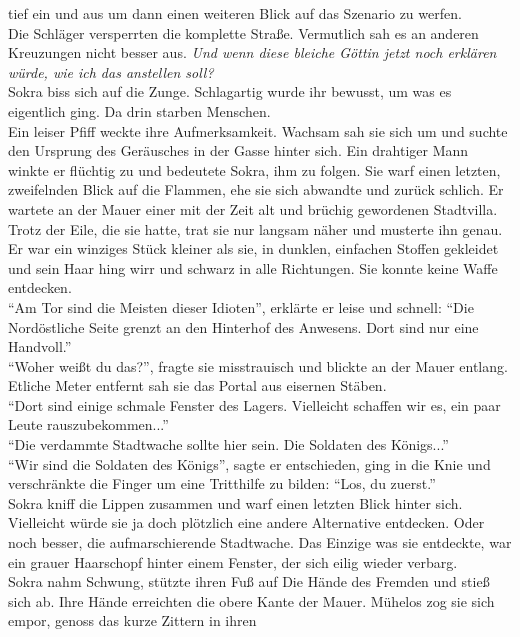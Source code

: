 tief ein und aus um dann einen weiteren Blick auf das Szenario zu werfen.\\
Die Schläger versperrten die komplette Straße. Vermutlich sah es an anderen Kreuzungen nicht besser 
aus. \textit{Und wenn diese bleiche Göttin jetzt noch erklären würde, wie ich das anstellen soll?}\\
Sokra biss sich auf die Zunge. Schlagartig wurde ihr bewusst, um was es eigentlich ging. Da drin 
starben Menschen.\\
Ein leiser Pfiff weckte ihre Aufmerksamkeit. Wachsam sah sie sich um und suchte den Ursprung des 
Geräusches in der Gasse hinter sich. Ein drahtiger Mann winkte er flüchtig zu und bedeutete Sokra, 
ihm zu folgen. Sie warf einen letzten, zweifelnden Blick auf die Flammen, ehe sie sich abwandte und 
zurück schlich. Er wartete an der Mauer einer mit der Zeit alt und brüchig gewordenen Stadtvilla. 
Trotz der Eile, die sie hatte, trat sie nur langsam näher und musterte ihn genau. Er war ein 
winziges Stück kleiner als sie, in dunklen, einfachen Stoffen gekleidet und sein Haar hing wirr und 
schwarz in alle Richtungen. Sie konnte keine Waffe entdecken.\\
``Am Tor sind die Meisten dieser Idioten'', erklärte er leise und schnell: ``Die Nordöstliche Seite 
grenzt an den Hinterhof des Anwesens. Dort sind nur eine Handvoll.''\\
``Woher weißt du das?'', fragte sie misstrauisch und blickte an der Mauer entlang. Etliche Meter 
entfernt sah sie das Portal aus eisernen Stäben.\\
``Dort sind einige schmale Fenster des Lagers. Vielleicht schaffen wir es, ein paar Leute 
rauszubekommen...''\\
``Die verdammte Stadtwache sollte hier sein. Die Soldaten des Königs...''\\
``Wir sind die Soldaten des Königs'', sagte er entschieden, ging in die Knie und verschränkte die 
Finger um eine Tritthilfe zu bilden: ``Los, du zuerst.''\\
Sokra kniff die Lippen zusammen und warf einen letzten Blick hinter sich. Vielleicht würde sie ja 
doch plötzlich eine andere Alternative entdecken. Oder noch besser, die aufmarschierende 
Stadtwache. Das Einzige was sie entdeckte, war ein grauer Haarschopf hinter einem Fenster, der sich 
eilig wieder verbarg.\\
Sokra nahm Schwung, stützte ihren Fuß auf Die Hände des Fremden und stieß sich ab. Ihre Hände 
erreichten die obere Kante der Mauer. Mühelos zog sie sich empor, genoss das kurze Zittern in ihren 
